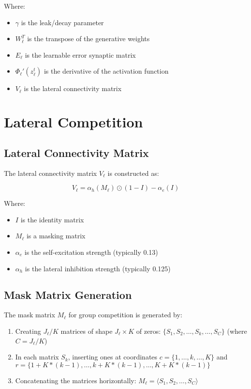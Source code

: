 \documentclass{article}
\begin{document}
Where:
\begin{itemize}
  \item $\gamma$ is the leak/decay parameter
  \item $W_\ell^T$ is the transpose of the generative weights
  \item $E_\ell$ is the learnable error synaptic matrix
  \item $\Phi_\ell'(z_\ell^t)$ is the derivative of the activation function
  \item $V_\ell$ is the lateral connectivity matrix
\end{itemize}

\section{Lateral Competition}

\subsection{Lateral Connectivity Matrix}

The lateral connectivity matrix $V_\ell$ is constructed as:

\begin{equation}
  V_\ell = \alpha_h(M_\ell) \odot (1-I) - \alpha_e(I)
\end{equation}

Where:
\begin{itemize}
  \item $I$ is the identity matrix
  \item $M_\ell$ is a masking matrix
  \item $\alpha_e$ is the self-excitation strength (typically 0.13)
  \item $\alpha_h$ is the lateral inhibition strength (typically 0.125)
\end{itemize}

\subsection{Mask Matrix Generation}

The mask matrix $M_\ell$ for group competition is generated by:

\begin{enumerate}
  \item Creating $J_\ell/K$ matrices of shape $J_\ell \times K$ of zeros: $\{S_1, S_2, \ldots, S_k, \ldots, S_C\}$ (where $C = J_\ell/K$)
  \item In each matrix $S_k$, inserting ones at coordinates $c = \{1, \ldots, k, \ldots, K\}$ and $r = \{1 + K*(k-1), \ldots, k+K*(k-1), \ldots, K+K*(k-1)\}$
  \item Concatenating the matrices horizontally: $M_\ell = \langle S_1, S_2, \ldots, S_C \rangle$
\end{enumerate}
\end{document}
